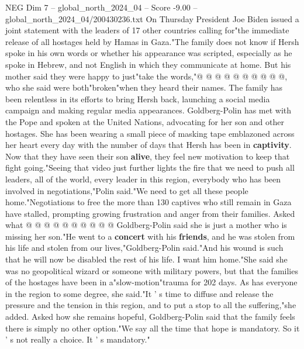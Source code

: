 \begin{textsample}{NEG Dim 7 – global\_north\_2024\_04 – Score -9.00 – global\_north\_2024\_04/200430236.txt}
On Thursday President Joe Biden issued a joint statement with the leaders of 17 other countries calling for"the immediate release of all hostages held by Hamas in Gaza."The family does not know if Hersh spoke in his own words or whether his appearance was scripted, especially as he spoke in Hebrew, and not English in which they communicate at home.
But his mother said they were happy to just"take the words,"@ @ @ @ @ @ @ @ @ @, who she said were both"broken"when they heard their names.
The family has been relentless in its efforts to bring Hersh back, launching a social media campaign and making regular media appearances.
Goldberg-Polin has met with the Pope and spoken at the United Nations, advocating for her son and other hostages.
She has been wearing a small piece of masking tape emblazoned across her heart every day with the number of days that Hersh has been in \textbf{captivity}.
Now that they have seen their son \textbf{alive}, they feel new motivation to keep that fight going."Seeing that video just further lights the fire that we need to push all leaders, all of the world, every leader in this region, everybody who has been involved in negotiations,"Polin said."We need to get all these people home."Negotiations to free the more than 130 captives who still remain in Gaza have stalled, prompting growing frustration and anger from their families.
Asked what @ @ @ @ @ @ @ @ @ @ Goldberg-Polin said she is just a mother who is missing her son."He went to a \textbf{concert} with his \textbf{friends}, and he was stolen from his life and stolen from our lives,"Goldberg-Polin said."And his wound is such that he will now be disabled the rest of his life.
I want him home."She said she was no geopolitical wizard or someone with military powers, but that the families of the hostages have been in a"slow-motion"trauma for 202 days.
As has everyone in the region to some degree, she said."It ' s time to diffuse and release the pressure and the tension in this region, and to put a stop to all the suffering,"she added.
Asked how she remains hopeful, Goldberg-Polin said that the family feels there is simply no other option."We say all the time that hope is mandatory.
So it ' s not really a choice.
It ' s mandatory."

\end{textsample}
